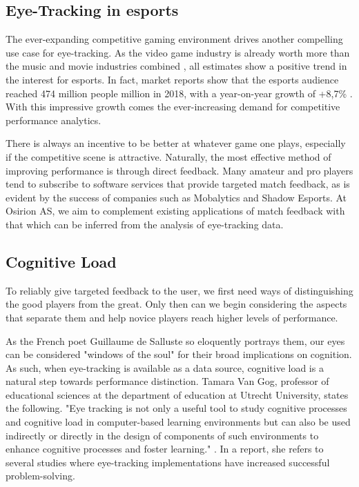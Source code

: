 \subsection{Eye-Tracking in \acrlong{esports}} \label{sec:intro/motivation/esports}

The ever-expanding competitive gaming environment drives another compelling use case for eye-tracking. As the video game industry is already worth more than the music and movie industries combined \cite{mangeloja2019}, all estimates show a positive trend in the interest for \acrfull{esports}. In fact, market reports show that the \acrshort{esports} audience reached 474 million people million in 2018, with a year-on-year growth of +8,7\% \cite{newzoo2021}. With this impressive growth comes the ever-increasing demand for competitive performance analytics.

There is always an incentive to be better at whatever game one plays, especially if the competitive scene is attractive. Naturally, the most effective method of improving performance is through direct feedback. Many amateur and pro players tend to subscribe to software services that provide targeted match feedback, as is evident by the success of companies such as Mobalytics and Shadow Esports. At Osirion AS, we aim to complement existing applications of match feedback with that which can be inferred from the analysis of eye-tracking data.

\subsection{Cognitive Load}

To reliably give targeted feedback to the user, we first need ways of distinguishing the good players from the great. Only then can we begin considering the aspects that separate them and help novice players reach higher levels of performance.

As the French poet Guillaume de Salluste so eloquently portrays them, our eyes can be considered "windows of the soul" \cite{hess1965} for their broad implications on cognition. As such, when eye-tracking is available as a data source, cognitive load is a natural step towards performance distinction. Tamara Van Gog, professor of educational sciences at the department of education at Utrecht University, states the following. "Eye tracking is not only a useful tool to study cognitive processes and cognitive load in computer-based learning environments but can also be used indirectly or directly in the design of components of such environments to enhance cognitive processes and foster learning." \cite{vanGog2013}. In a report, she refers to several studies where eye-tracking implementations have increased successful problem-solving.

